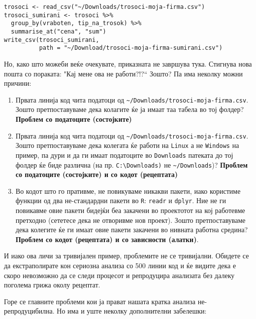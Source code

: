 \documentclass[
]{book}
\begin{document}
\begin{verbatim}
trosoci <- read_csv("~/Downloads/trosoci-moja-firma.csv")
trosoci_sumirani <- trosoci %>% 
  group_by(vraboten, tip_na_trosok) %>% 
  summarise_at("cena", "sum")
write_csv(trosoci_sumirani, 
          path = "~/Download/trosoci-moja-firma-sumirani.csv")
\end{verbatim}

Но, како што можеби веќе очекувате, приказната не завршува тука. Стигнува нова пошта со пораката: "Кај мене ова не работи?!?{}`` Зошто? Па има неколку можни причини:

\begin{enumerate}
\def\labelenumi{\arabic{enumi}.}
\item
  Првата линија код чита податоци од \texttt{\textasciitilde{}/Downloads/trosoci-moja-firma.csv}. Зошто претпоставуваме дека колагите ќе ја имаат таа табела во тој фолдер? \textbf{Проблем со податоците (состојките)}
\item
  Првата линија код чита податоци од \texttt{\textasciitilde{}/Downloads/trosoci-moja-firma.csv}. Зошто претпоставуваме дека колегата ќе работи на \texttt{Linux} а не \texttt{Windows} на пример, па дури и да ги имаат податоците во \texttt{Downloads} патеката до тој фолдер ќе биде различна (на пр. \texttt{C:\textbackslash{}Downloads)} не \texttt{\textasciitilde{}/Downloads})? \textbf{Проблем со податоците (состојките) и со кодот (рецептата)}
\item
  Во кодот што го пративме, не повикуваме никакви пакети, иако користиме функции од два не-стандардни пакети во \texttt{R}: \texttt{readr} и \texttt{dplyr}. Ние не ги повикавме овие пакети бидејќи беа закачени во проектотот на кој работевме претходно (сететесе дека не отворивме нов проект). Зошто претпоставуваме дека колегите ќе ги имаат овие пакети закачени во нивната работна средина? \textbf{Проблем со кодот (рецептата) и со зависности (алатки)}.
\end{enumerate}

И иако ова личи за тривијален пример, проблемите не се тривијални. Обидете се да екстраполирате кон сериозна анализа со 500 линии код и ќе видите дека е скоро невозможно да се следи процесот и репродуцира анализата без далеку поголема грижа околу рецептат.

Горе се главните проблеми кои ја прават нашата кратка анализа не-репродуцибилна. Но има и уште неколку дополнителни забелешки:
\end{document}
